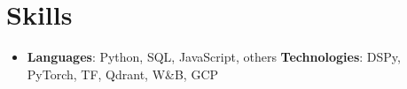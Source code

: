 \documentclass[letterpaper,11pt]{article}
\newcommand{\resumeSubHeadingListStart}{\begin{itemize}[leftmargin=*]}
\newcommand{\resumeSubHeadingListEnd}{\end{itemize}}
\begin{document}
\section{Skills}
  \resumeSubHeadingListStart
    \item{
      \textbf{Languages}{: Python, SQL, JavaScript, others}
      \hfill
      \textbf{Technologies}{: DSPy, PyTorch, TF, Qdrant, W\&B, GCP}
    }
  \resumeSubHeadingListEnd


\end{document}
